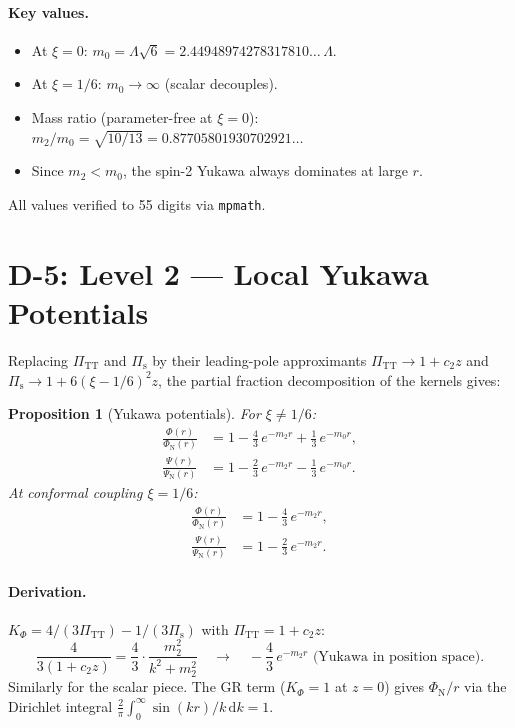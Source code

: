 \documentclass[11pt,a4paper]{article}
\newcommand{\dd}{\mathrm{d}}
\newcommand{\PiTT}{\Pi_{\mathrm{TT}}}
\newcommand{\Pis}{\Pi_{\mathrm{s}}}
\newcommand{\KPhi}{K_\Phi}
\newtheorem{proposition}[theorem]{Proposition}
\begin{document}
\paragraph{Key values.}
\begin{itemize}
  \item At $\xi = 0$: $m_0 = \Lambda\sqrt{6} = 2.44948974278317810\ldots\,\Lambda$.
  \item At $\xi = 1/6$: $m_0 \to \infty$ (scalar decouples).
  \item Mass ratio (parameter-free at $\xi = 0$):
    $m_2/m_0 = \sqrt{10/13} = 0.87705801930702921\ldots$
  \item Since $m_2 < m_0$, the spin-2 Yukawa always dominates at large $r$.
\end{itemize}

All values verified to 55 digits via \texttt{mpmath}.


\section{D-5: Level 2 --- Local Yukawa Potentials}
\label{sec:yukawa}

Replacing $\PiTT$ and $\Pis$ by their leading-pole approximants
$\PiTT \to 1 + c_2 z$ and $\Pis \to 1 + 6(\xi-1/6)^2 z$, the partial
fraction decomposition of the kernels gives:

\begin{proposition}[Yukawa potentials]\label{prop:yukawa}
For $\xi \neq 1/6$:
\begin{align}
  \frac{\Phi(r)}{\Phi_{\mathrm{N}}(r)} &= 1
    - \frac{4}{3}\,e^{-m_2 r} + \frac{1}{3}\,e^{-m_0 r},
    \label{eq:phi_yukawa} \\
  \frac{\Psi(r)}{\Psi_{\mathrm{N}}(r)} &= 1
    - \frac{2}{3}\,e^{-m_2 r} - \frac{1}{3}\,e^{-m_0 r}.
    \label{eq:psi_yukawa}
\end{align}
At conformal coupling $\xi = 1/6$:
\begin{align}
  \frac{\Phi(r)}{\Phi_{\mathrm{N}}(r)} &= 1
    - \frac{4}{3}\,e^{-m_2 r}, \\
  \frac{\Psi(r)}{\Psi_{\mathrm{N}}(r)} &= 1
    - \frac{2}{3}\,e^{-m_2 r}.
\end{align}
\end{proposition}

\paragraph{Derivation.}
$\KPhi = 4/(3\PiTT) - 1/(3\Pis)$ with $\PiTT = 1 + c_2 z$:
\begin{equation}
  \frac{4}{3(1 + c_2 z)}
  = \frac{4}{3} \cdot \frac{m_2^2}{k^2 + m_2^2}
  \quad\longrightarrow\quad
  -\frac{4}{3}\,e^{-m_2 r}
  \text{ (Yukawa in position space).}
\end{equation}
Similarly for the scalar piece.  The GR term ($\KPhi = 1$ at $z = 0$) gives
$\Phi_{\mathrm{N}}/r$ via the Dirichlet integral
$\frac{2}{\pi}\int_0^\infty \sin(kr)/k\,\dd k = 1$.
\end{document}
